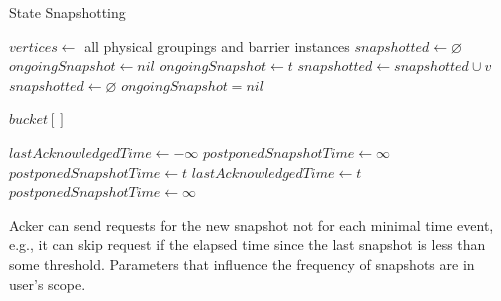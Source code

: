 \begin{algorithm}
\caption{State Snapshotting}
\label{state-snapshoting}
  \begin{algorithmic}
      \State $vertices \gets$ all physical groupings and barrier instances
      \State $snapshotted \gets \varnothing$
      \State $ongoingSnapshot \gets nil$
      \State
         
            \State {}
          \EndFor
          \State $ongoingSnapshot \gets t$
        \EndIf
      \EndEvent
        \State $snapshotted \gets snapshotted \cup v$
          \State {} 
          \State $snapshotted \gets \varnothing$
          \State $ongoingSnapshot = nil$
        \EndIf
      \EndEvent
    \EndProcess

      \State $bucket[]$ 
      \State
        \State {} 
        \State {}
        \State {}
      \EndEvent
    \EndProcess

      \State $lastAcknowledgedTime \gets -\infty$ 
      \State $postponedSnapshotTime \gets \infty$
      \State
          \State {}
        \Else
          \State $postponedSnapshotTime \gets t$
        \EndIf
      \EndEvent
        \State $lastAcknowledgedTime \gets t$
          \State {}
          \State $postponedSnapshotTime \gets \infty$
        \EndIf
      \EndEvent
    \EndProcess
  \end{algorithmic}
\end{algorithm}

Acker can send requests for the new snapshot not for each minimal time event, e.g., it can skip request if the elapsed time since the last snapshot is less than some threshold. Parameters that influence the frequency of snapshots are in user's scope.

